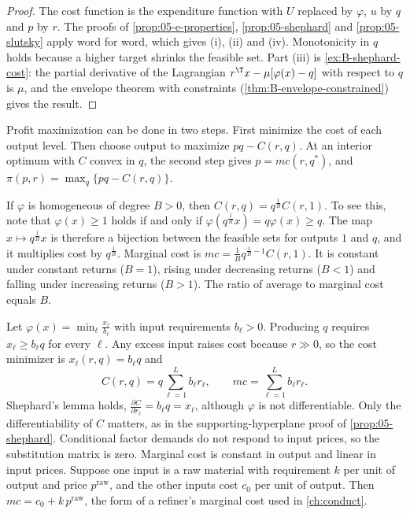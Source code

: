 \begin{proof}
The cost function is the expenditure function with $U$ replaced by $\varphi$, $u$ by $q$ and $p$ by $r$. The
proofs of \cref{prop:05-e-properties}, \cref{prop:05-shephard} and \cref{prop:05-slutsky} apply word for word,
which gives (i), (ii) and (iv). Monotonicity in $q$ holds because a higher target shrinks the feasible
set. Part (iii) is \cref{ex:B-shephard-cost}: the partial derivative of the Lagrangian
$r^\T x - \mu[\varphi(x) - q]$ with respect to $q$ is $\mu$, and the envelope theorem with constraints
(\cref{thm:B-envelope-constrained}) gives the result.
\end{proof}

Profit maximization can be done in two steps. First minimize the cost of each output level. Then choose
output to maximize $pq - C(r, q)$. At an interior optimum with $C$ convex in $q$, the second step gives
$p = mc(r, q^*)$, and $\pi(p, r) = \max_q\{pq - C(r, q)\}$.

\begin{remark}\label{rem:B-returns}
If $\varphi$ is homogeneous of degree $B > 0$, then $C(r, q) = q^{\frac{1}{B}}C(r, 1)$. To see this, note that
$\varphi(x) \geq 1$ holds if and only if $\varphi(q^{\frac{1}{B}}x) = q\varphi(x) \geq q$. The map
$x \mapsto q^{\frac{1}{B}}x$ is therefore a bijection between the feasible sets for outputs $1$ and $q$, and it
multiplies cost by $q^{\frac{1}{B}}$. Marginal cost is $mc = \frac{1}{B}q^{\frac{1}{B} - 1}C(r, 1)$. It is constant
under constant returns ($B = 1$), rising under decreasing returns ($B < 1$) and falling under increasing
returns ($B > 1$). The ratio of average to marginal cost equals $B$.
\end{remark}

\begin{example}\label{ex:B-leontief}
Let $\varphi(x) = \min_\ell\frac{x_\ell}{b_\ell}$ with input requirements $b_\ell > 0$. Producing $q$ requires
$x_\ell \geq b_\ell q$ for every $\ell$. Any excess input raises cost because $r \gg 0$, so the cost minimizer is
$x_\ell(r, q) = b_\ell q$ and
\begin{equation*}
C(r, q) = q\sum_{\ell = 1}^Lb_\ell r_\ell, \qquad mc = \sum_{\ell = 1}^Lb_\ell r_\ell .
\end{equation*}
Shephard's lemma holds, $\frac{\partial C}{\partial r_\ell} = b_\ell q = x_\ell$, although $\varphi$ is not
differentiable. Only the differentiability of $C$ matters, as in the supporting-hyperplane proof of
\cref{prop:05-shephard}.
Conditional factor demands do not respond to input prices, so the substitution matrix is zero. Marginal
cost is constant in output and linear in input prices. Suppose one input is a raw material with requirement
$k$ per unit of output and price $p^{\mathrm{raw}}$, and the other inputs cost $c_0$ per unit of output. Then
$mc = c_0 + k\,p^{\mathrm{raw}}$, the form of a refiner's marginal cost used in \cref{ch:conduct}.
\end{example}

